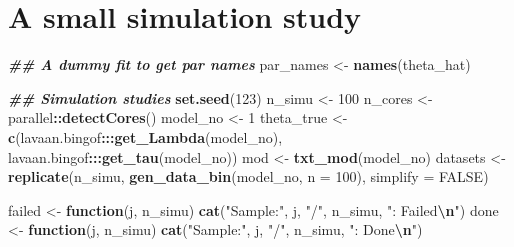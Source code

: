 \documentclass[
]{article}
\newenvironment{Shaded}{\begin{snugshade}}{\end{snugshade}}
\newcommand{\AttributeTok}[1]{\textcolor[rgb]{0.13,0.29,0.53}{#1}}
\newcommand{\ConstantTok}[1]{\textcolor[rgb]{0.56,0.35,0.01}{#1}}
\newcommand{\ControlFlowTok}[1]{\textcolor[rgb]{0.13,0.29,0.53}{\textbf{#1}}}
\newcommand{\DecValTok}[1]{\textcolor[rgb]{0.00,0.00,0.81}{#1}}
\newcommand{\DocumentationTok}[1]{\textcolor[rgb]{0.56,0.35,0.01}{\textbf{\textit{#1}}}}
\newcommand{\FunctionTok}[1]{\textcolor[rgb]{0.13,0.29,0.53}{\textbf{#1}}}
\newcommand{\NormalTok}[1]{#1}
\newcommand{\OtherTok}[1]{\textcolor[rgb]{0.56,0.35,0.01}{#1}}
\newcommand{\SpecialCharTok}[1]{\textcolor[rgb]{0.81,0.36,0.00}{\textbf{#1}}}
\newcommand{\StringTok}[1]{\textcolor[rgb]{0.31,0.60,0.02}{#1}}
\begin{document}
\section{A small simulation study}\label{a-small-simulation-study}

\begin{Shaded}
\begin{Highlighting}[]
\DocumentationTok{\#\# A dummy fit to get par names}
\NormalTok{par\_names }\OtherTok{\textless{}{-}} \FunctionTok{names}\NormalTok{(theta\_hat)}

\DocumentationTok{\#\# Simulation studies}
\FunctionTok{set.seed}\NormalTok{(}\DecValTok{123}\NormalTok{)}
\NormalTok{n\_simu }\OtherTok{\textless{}{-}} \DecValTok{100}
\NormalTok{n\_cores }\OtherTok{\textless{}{-}}\NormalTok{ parallel}\SpecialCharTok{::}\FunctionTok{detectCores}\NormalTok{()}
\NormalTok{model\_no }\OtherTok{\textless{}{-}} \DecValTok{1}
\NormalTok{theta\_true }\OtherTok{\textless{}{-}} \FunctionTok{c}\NormalTok{(lavaan.bingof}\SpecialCharTok{:::}\FunctionTok{get\_Lambda}\NormalTok{(model\_no),}
\NormalTok{                lavaan.bingof}\SpecialCharTok{:::}\FunctionTok{get\_tau}\NormalTok{(model\_no))}
\NormalTok{mod }\OtherTok{\textless{}{-}} \FunctionTok{txt\_mod}\NormalTok{(model\_no)}
\NormalTok{datasets }\OtherTok{\textless{}{-}} \FunctionTok{replicate}\NormalTok{(n\_simu, }\FunctionTok{gen\_data\_bin}\NormalTok{(model\_no, }\AttributeTok{n =} \DecValTok{100}\NormalTok{), }\AttributeTok{simplify =} \ConstantTok{FALSE}\NormalTok{)}

\NormalTok{failed }\OtherTok{\textless{}{-}} \ControlFlowTok{function}\NormalTok{(j, n\_simu) }\FunctionTok{cat}\NormalTok{(}\StringTok{"Sample:"}\NormalTok{, j, }\StringTok{"/"}\NormalTok{, n\_simu, }\StringTok{": Failed}\SpecialCharTok{\textbackslash{}n}\StringTok{"}\NormalTok{)}
\NormalTok{done }\OtherTok{\textless{}{-}} \ControlFlowTok{function}\NormalTok{(j, n\_simu) }\FunctionTok{cat}\NormalTok{(}\StringTok{"Sample:"}\NormalTok{, j, }\StringTok{"/"}\NormalTok{, n\_simu, }\StringTok{": Done}\SpecialCharTok{\textbackslash{}n}\StringTok{"}\NormalTok{)}


\end{Highlighting}
\end{Shaded}
\end{document}
